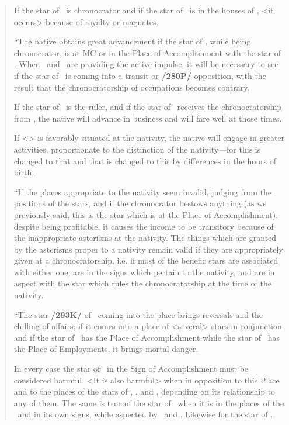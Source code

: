 \begin{quote}
If the star of \Jupiter\, is chronocrator and if the star of \Mars\, is in the houses of \Jupiter, <it occurs> because of royalty or magnates.

“The native obtains great advancement if the star of \Jupiter, while being chronocrator, is at MC or in the Place of Accomplishment with the star of \Mars. When \Jupiter\, and \Mars\, are providing the
active impulse, it will be necessary to see if the star of \Saturn\, is coming into a transit or \textbf{/280P/} opposition, with the result that the chronocratorship of occupations becomes contrary. 

If the star of \Mercury\, is the ruler, and if the star of \Jupiter\, receives the chronocratorship from \Mercury, the native will advance in business and will fare well at those times. 

If <\Mercury> is favorably situated at the nativity, the native will engage in greater activities, proportionate to the distinction of the nativity—for this is changed to that and that is changed to this by differences in the hours of birth.

“If the places appropriate to the nativity seem invalid, judging from the positions of the stars, and if the chronocrator bestows anything (as we previously said, this is the star which is at the Place of Accomplishment), despite being profitable, it causes the income to be transitory because of the inappropriate asterisms at the nativity. The things which are granted by the asterisms proper to a nativity remain valid if they are appropriately given at a chronocratorship, i.e. if most of the benefic stars are associated with either one, are in the signs which pertain to the nativity, and are in aspect with the star which rules the chronocratorship at the time of the nativity.

“The star \textbf{/293K/} of \Saturn\, coming into the place brings reversals and the chilling of affairs; if it comes into a place of <several> stars in conjunction and if the star of \Mars\, has the Place of Accomplishment while the star of \Saturn\, has the Place of Employments, it brings mortal danger. 

In every case the star of \Saturn\, in the Sign of Accomplishment must be considered harmful. <It is also harmful> when in opposition to this Place and to the places of the stars of \Mars, \Venus, and \Mercury, depending on its relationship to any of them. The same is true of the star of \Mercury\, when it is in the places of the \Moon\, and in its own signs, while aspected by \Mars\, and \Saturn. Likewise for the star of \Venus. 


\end{quote}
